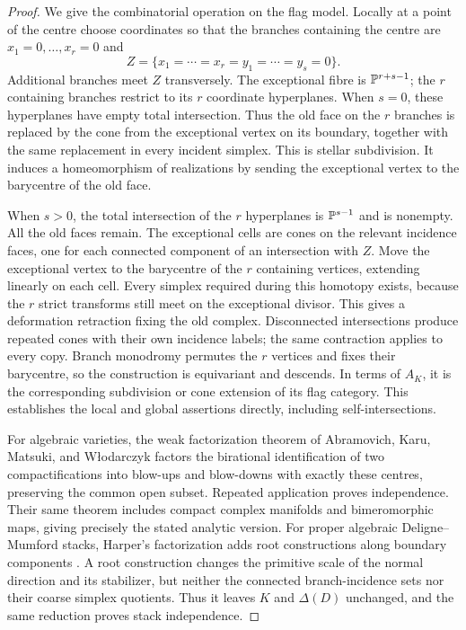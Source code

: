 \begin{proof}
We give the combinatorial operation on the flag model.  Locally at a point of the centre choose coordinates so that the branches containing the centre are $x_1=0,\ldots,x_r=0$ and
\[
 Z=\{x_1=\cdots=x_r=y_1=\cdots=y_s=0\}.
\]
Additional branches meet $Z$ transversely.  The exceptional fibre is $\mathbb P^{r+s-1}$; the $r$ containing branches restrict to its $r$ coordinate hyperplanes.  When $s=0$, these hyperplanes have empty total intersection.  Thus the old face on the $r$ branches is replaced by the cone from the exceptional vertex on its boundary, together with the same replacement in every incident simplex.  This is stellar subdivision.  It induces a homeomorphism of realizations by sending the exceptional vertex to the barycentre of the old face.

When $s>0$, the total intersection of the $r$ hyperplanes is $\mathbb P^{s-1}$ and is nonempty.  All the old faces remain.  The exceptional cells are cones on the relevant incidence faces, one for each connected component of an intersection with $Z$.  Move the exceptional vertex to the barycentre of the $r$ containing vertices, extending linearly on each cell.  Every simplex required during this homotopy exists, because the $r$ strict transforms still meet on the exceptional divisor.  This gives a deformation retraction fixing the old complex.  Disconnected intersections produce repeated cones with their own incidence labels; the same contraction applies to every copy.  Branch monodromy permutes the $r$ vertices and fixes their barycentre, so the construction is equivariant and descends.  In terms of $A_K$, it is the corresponding subdivision or cone extension of its flag category.  This establishes the local and global assertions directly, including self-intersections.

For algebraic varieties, the weak factorization theorem of Abramovich, Karu, Matsuki, and W{\l}odarczyk \cite[Theorem~0.3.1, especially clause~(6)]{AKMW2002} factors the birational identification of two compactifications into blow-ups and blow-downs with exactly these centres, preserving the common open subset.  Repeated application proves independence.  Their same theorem includes compact complex manifolds and bimeromorphic maps, giving precisely the stated analytic version.  For proper algebraic Deligne--Mumford stacks, Harper's factorization adds root constructions along boundary components \cite[Theorems~1.1--1.2]{Harper2017}.  A root construction changes the primitive scale of the normal direction and its stabilizer, but neither the connected branch-incidence sets nor their coarse simplex quotients.  Thus it leaves $K$ and $\Delta(D)$ unchanged, and the same reduction proves stack independence.


\end{proof}
